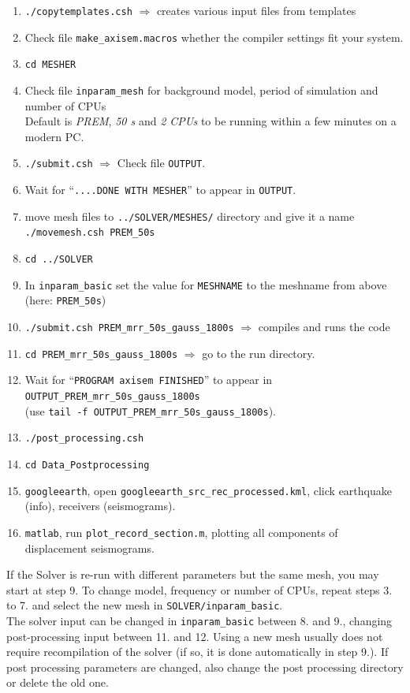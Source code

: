 \documentclass{article}
\begin{document}
\begin{enumerate}
    \item \verb|./copytemplates.csh| $\Rightarrow$ creates various input files from templates
    \item Check file \verb|make_axisem.macros| whether the compiler settings fit your
          system.
    \item \verb|cd MESHER|
    \item Check file {\tt inparam\_mesh} for background model, period of simulation and
          number of CPUs \\
          Default is \textit{PREM}, \textit{50 s} and \textit{2 CPUs} to be running within a
          few minutes on a modern PC.
    \item \verb|./submit.csh| $\Rightarrow$ Check file {\tt OUTPUT}.
    \item Wait for ``{\tt ....DONE WITH MESHER}'' to appear in {\tt OUTPUT}.
    \item move mesh files to \verb|../SOLVER/MESHES/| directory and give it a name
          \verb|./movemesh.csh PREM_50s|
    \item \verb|cd ../SOLVER|
    \item In \verb|inparam_basic| set the value for \verb|MESHNAME| to the meshname from
          above (here: \verb|PREM_50s|)
    \item \verb|./submit.csh PREM_mrr_50s_gauss_1800s|  $\Rightarrow$ compiles and runs
          the code
    \item \verb|cd PREM_mrr_50s_gauss_1800s| $\Rightarrow$ go to the run directory.
    \item Wait for ``\verb|PROGRAM axisem FINISHED|'' to appear in
          \verb|OUTPUT_PREM_mrr_50s_gauss_1800s| \\
          (use \verb|tail -f OUTPUT_PREM_mrr_50s_gauss_1800s|).
    \item \verb|./post_processing.csh|
    \item \verb|cd Data_Postprocessing|
    \item \verb|googleearth|, open {\tt googleearth\_src\_rec\_processed.kml}, click
            earthquake (info), receivers (seismograms).
    \item {\tt matlab}, run {\tt plot\_record\_section.m}, plotting all components
            of displacement seismograms.

\end{enumerate}
If the Solver is re-run with different parameters but the same mesh, you may start at step 9.
To change model, frequency or number of CPUs, repeat steps 3. to 7. and select the new
mesh in \verb|SOLVER/inparam_basic|. \\
The solver input can be changed in \verb|inparam_basic| between 8. and 9.,
changing post-processing input between 11. and 12. Using a new mesh usually
does not require
recompilation of the solver (if so, it is done automatically in step 9.). If post
processing parameters are changed, also change the post processing directory or
delete the old one.
\end{document}
